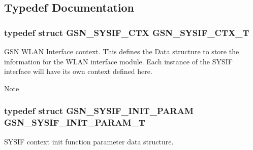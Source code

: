 \subsection{Typedef Documentation}
\hypertarget{a00630_ga4109d84173a303c73e534f9bc6e04a03}{
\subsubsection[{GSN\_\-SYSIF\_\-CTX\_\-T}]{\setlength{\rightskip}{0pt plus 5cm}typedef struct {\bf GSN\_\-SYSIF\_\-CTX} {\bf GSN\_\-SYSIF\_\-CTX\_\-T}}}
\label{a00630_ga4109d84173a303c73e534f9bc6e04a03}


GSN WLAN Interface context. This defines the Data structure to store the information for the WLAN interface module. Each instance of the SYSIF interface will have its own context defined here. 

\begin{DoxyNote}{Note}

\end{DoxyNote}
\hypertarget{a00630_gaefe015ce31bfc3747e1caed732284b8e}{
\subsubsection[{GSN\_\-SYSIF\_\-INIT\_\-PARAM\_\-T}]{\setlength{\rightskip}{0pt plus 5cm}typedef struct {\bf GSN\_\-SYSIF\_\-INIT\_\-PARAM} {\bf GSN\_\-SYSIF\_\-INIT\_\-PARAM\_\-T}}}
\label{a00630_gaefe015ce31bfc3747e1caed732284b8e}


SYSIF context init function parameter data structure. 



